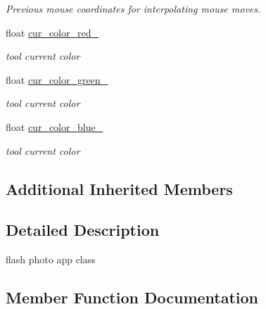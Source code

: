 \begin{DoxyCompactItemize}
\begin{DoxyCompactList}\small\item\em Previous mouse coordinates for interpolating mouse moves. \end{DoxyCompactList}\item 
float \hyperlink{classimage__tools_1_1FlashPhotoApp_a1f05e2dcc771bb2b915fe5713cafd06c}{cur\+\_\+color\+\_\+red\+\_\+}\hypertarget{classimage__tools_1_1FlashPhotoApp_a1f05e2dcc771bb2b915fe5713cafd06c}{}\label{classimage__tools_1_1FlashPhotoApp_a1f05e2dcc771bb2b915fe5713cafd06c}

\begin{DoxyCompactList}\small\item\em tool current color \end{DoxyCompactList}\item 
float \hyperlink{classimage__tools_1_1FlashPhotoApp_a06056579211bf21a52db97fdd9cd1729}{cur\+\_\+color\+\_\+green\+\_\+}\hypertarget{classimage__tools_1_1FlashPhotoApp_a06056579211bf21a52db97fdd9cd1729}{}\label{classimage__tools_1_1FlashPhotoApp_a06056579211bf21a52db97fdd9cd1729}

\begin{DoxyCompactList}\small\item\em tool current color \end{DoxyCompactList}\item 
float \hyperlink{classimage__tools_1_1FlashPhotoApp_a87cfd54779dd53c6f4fd387984251ebc}{cur\+\_\+color\+\_\+blue\+\_\+}\hypertarget{classimage__tools_1_1FlashPhotoApp_a87cfd54779dd53c6f4fd387984251ebc}{}\label{classimage__tools_1_1FlashPhotoApp_a87cfd54779dd53c6f4fd387984251ebc}

\begin{DoxyCompactList}\small\item\em tool current color \end{DoxyCompactList}\end{DoxyCompactItemize}
\subsection*{Additional Inherited Members}


\subsection{Detailed Description}
flash photo app class 

\subsection{Member Function Documentation}
